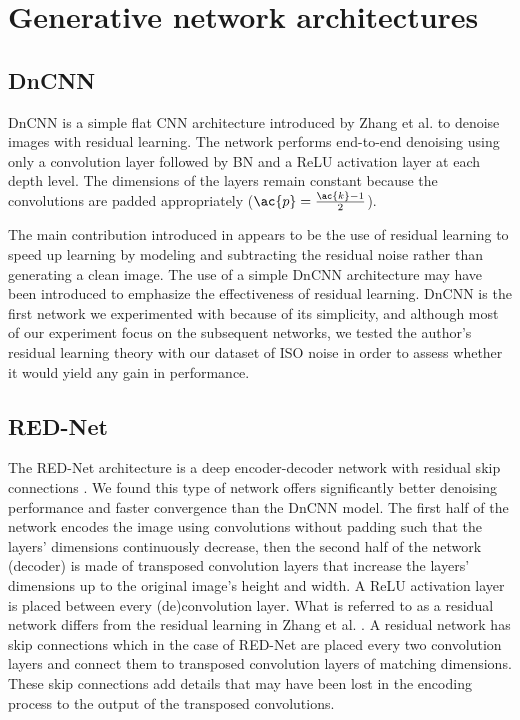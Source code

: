 
\section{Generative network architectures}\label{sec:Generative network architectures}
\subsection{DnCNN}
DnCNN is a simple flat \ac{CNN} architecture introduced by Zhang et al. \cite{dncnn} to denoise images with residual learning. The network performs end-to-end denoising using only a convolution layer followed by \acl{BN} and a \ac{ReLU} activation layer at each depth level. The dimensions of the layers remain constant because the convolutions are padded appropriately ($\ac{p}={\ac{k}-1\over{2}}$). %

The main contribution introduced in \cite{dncnn} appears to be the use of residual learning to speed up learning by modeling and subtracting the residual noise rather than generating a clean image. The use of a simple DnCNN architecture may have been introduced to emphasize the effectiveness of residual learning. DnCNN is the first network we experimented with because of its simplicity, and although most of our experiment focus on the subsequent networks, we tested the author's residual learning theory with our dataset of ISO noise in order to assess whether it would yield any gain in performance.
\subsection{RED-Net}
The \ac{RED-Net} architecture is a deep encoder-decoder network with residual skip connections \cite{rednet}. We found this type of network offers significantly better denoising performance and faster convergence than the DnCNN model. The first half of the network encodes the image using convolutions without padding such that the layers' dimensions continuously decrease, then the second half of the network (decoder) is made of transposed convolution layers that increase the layers' dimensions up to the original image's height and width. A \ac{ReLU} activation layer is placed between every (de)convolution layer. What is referred to as a residual network differs from the residual learning in Zhang et al. \cite{dncnn}. A residual network has skip connections which in the case of \ac{RED-Net} are placed every two convolution layers and connect them to transposed convolution layers of matching dimensions. These skip connections add details that may have been lost in the encoding process to the output of the transposed convolutions. 
